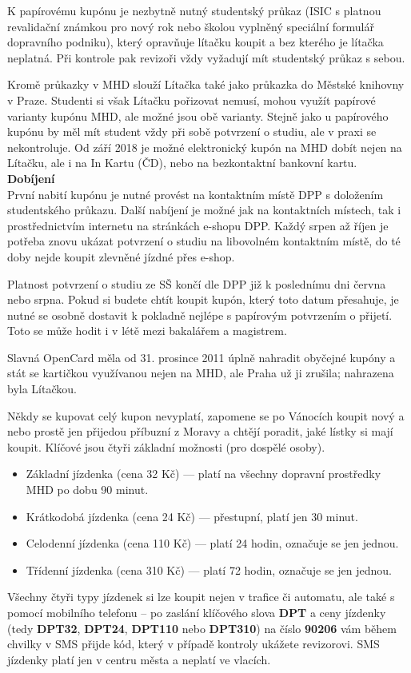 K papírovému kupónu je nezbytně nutný studentský průkaz (ISIC s platnou
revalidační známkou pro nový rok nebo školou vyplněný speciální formulář
dopravního podniku), který opravňuje lítačku koupit a bez kterého je lítačka
neplatná. Při kontrole pak revizoři vždy vyžadují mít studentský průkaz s sebou.

Kromě průkazky v MHD slouží Lítačka také jako průkazka do Městské knihovny v
Praze. Studenti si však Lítačku pořizovat nemusí, mohou využít papírové varianty
kupónu MHD, ale možné jsou obě varianty. Stejně jako u papírového kupónu by měl
mít student vždy při sobě potvrzení o studiu, ale v praxi se nekontroluje. Od
září 2018 je možné elektronický kupón na MHD dobít nejen na Lítačku, ale i na In
Kartu (ČD), nebo na bezkontaktní bankovní kartu.
\\
\textbf{Dobíjení}
\\
První nabití kupónu je nutné provést na kontaktním místě DPP s doložením
studentského průkazu. Další nabíjení je možné jak na kontaktních místech, tak i
prostřednictvím internetu na stránkách e-shopu DPP. Každý srpen až říjen je
potřeba znovu ukázat potvrzení o studiu na libovolném kontaktním místě, do té
doby nejde koupit zlevněné jízdné přes e-shop.

Platnost potvrzení o studiu ze SŠ končí dle DPP již k poslednímu dni června nebo
srpna. Pokud si budete chtít koupit kupón, který toto datum přesahuje, je nutné
se osobně dostavit k pokladně nejlépe s papírovým potvrzením o přijetí. Toto se
může hodit i v létě mezi bakalářem a magistrem.

Slavná OpenCard měla od 31. prosince 2011 úplně nahradit obyčejné kupóny a stát
se kartičkou využívanou nejen na MHD, ale Praha už ji zrušila; nahrazena byla
Lítačkou.

Někdy se kupovat celý kupon nevyplatí, zapomene se po Vánocích koupit nový a
nebo prostě jen přijedou příbuzní z Moravy a chtějí poradit, jaké lístky si mají
koupit. Klíčové jsou čtyři základní možnosti (pro dospělé osoby).
\begin{itemize}
\item Základní jízdenka (cena 32 Kč) --- platí na všechny dopravní prostředky
MHD po dobu 90 minut.
\item Krátkodobá jízdenka (cena 24 Kč) --- přestupní, platí jen 30 minut.
\item Celodenní jízdenka (cena 110 Kč) --- platí 24 hodin, označuje se jen
jednou.
\item Třídenní jízdenka (cena 310 Kč) --- platí 72 hodin, označuje se jen
jednou.
\end{itemize}
Všechny čtyři typy jízdenek si lze koupit nejen v trafice či automatu, ale také
s pomocí mobilního telefonu – po zaslání klíčového slova \textbf{DPT} a ceny
jízdenky (tedy \textbf{DPT32}, \textbf{DPT24}, \textbf{DPT110} nebo
\textbf{DPT310}) na číslo \textbf{90206} vám během chvilky v SMS přijde kód,
který v případě kontroly ukážete revizorovi. SMS jízdenky platí jen v centru
města a neplatí ve vlacích.

